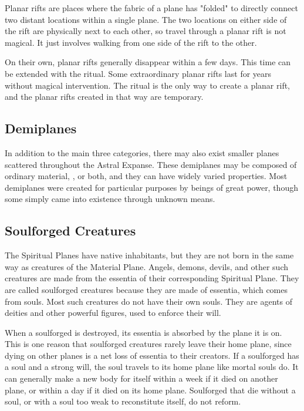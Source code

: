   \label{Planar Rifts}
    Planar rifts are places where the fabric of a plane has "folded" to directly connect two distant locations within a single plane.
    The two locations on either side of the rift are physically next to each other, so travel through a planar rift is not magical.
    It just involves walking from one side of the rift to the other.

    On their own, planar rifts generally disappear within a few days.
    This time can be extended with the  ritual.
    Some extraordinary planar rifts last for years without magical intervention.
    The  ritual is the only way to create a planar rift, and the planar rifts created in that way are temporary.

  \subsection{Demiplanes}
    In addition to the main three categories, there may also exist smaller planes scattered throughout the Astral Expanse.
    These demiplanes may be composed of ordinary material, , or both, and they can have widely varied properties.
    Most demiplanes were created for particular purposes by beings of great power, though some simply came into existence through unknown means.

  \subsection{Soulforged Creatures}
    The Spiritual Planes have native inhabitants, but they are not born in the same way as creatures of the Material Plane.
    Angels, demons, devils, and other such creatures are made from the essentia of their corresponding Spiritual Plane.
    They are called soulforged creatures because they are made of essentia, which comes from souls.
    Most such creatures do not have their own souls.
    They are agents of deities and other powerful figures, used to enforce their will.

    When a soulforged is destroyed, its essentia is absorbed by the plane it is on.
    This is one reason that soulforged creatures rarely leave their home plane, since dying on other planes is a net loss of essentia to their creators.
    If a soulforged has a soul and a strong will, the soul travels to its home plane like mortal souls do.
    It can generally make a new body for itself within a week if it died on another plane, or within a day if it died on its home plane.
    Soulforged that die without a soul, or with a soul too weak to reconstitute itself, do not reform.


